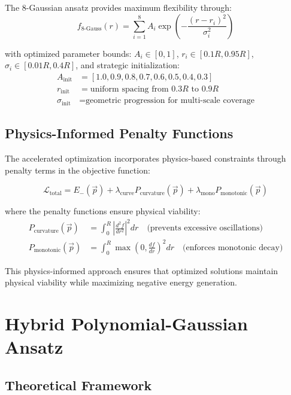 \documentclass[12pt,a4paper]{article}
\begin{document}
The 8-Gaussian ansatz provides maximum flexibility through:
\begin{equation}
f_{8\text{-Gauss}}(r) = \sum_{i=1}^{8} A_i \exp\left(-\frac{(r - r_i)^2}{\sigma_i^2}\right)
\end{equation}

with optimized parameter bounds: $A_i \in [0,1]$, $r_i \in [0.1R, 0.95R]$, $\sigma_i \in [0.01R, 0.4R]$, and strategic initialization:
\begin{align}
A_{\text{init}} &= [1.0, 0.9, 0.8, 0.7, 0.6, 0.5, 0.4, 0.3] \\
r_{\text{init}} &= \text{uniform spacing from } 0.3R \text{ to } 0.9R \\
\sigma_{\text{init}} &= \text{geometric progression for multi-scale coverage}
\end{align}

\subsection{Physics-Informed Penalty Functions}

The accelerated optimization incorporates physics-based constraints through penalty terms in the objective function:

\begin{equation}
\mathcal{L}_{\text{total}} = E_-(\vec{p}) + \lambda_{\text{curve}} P_{\text{curvature}}(\vec{p}) + \lambda_{\text{mono}} P_{\text{monotonic}}(\vec{p})
\end{equation}

where the penalty functions ensure physical viability:
\begin{align}
P_{\text{curvature}}(\vec{p}) &= \int_0^R \left|\frac{d^2f}{dr^2}\right|^2 dr \quad \text{(prevents excessive oscillations)} \\
P_{\text{monotonic}}(\vec{p}) &= \int_0^R \max\left(0, \frac{df}{dr}\right)^2 dr \quad \text{(enforces monotonic decay)}
\end{align}

This physics-informed approach ensures that optimized solutions maintain physical viability while maximizing negative energy generation.

\section{Hybrid Polynomial-Gaussian Ansatz}
\label{sec:hybrid_ansatz}

\subsection{Theoretical Framework}
\end{document}
